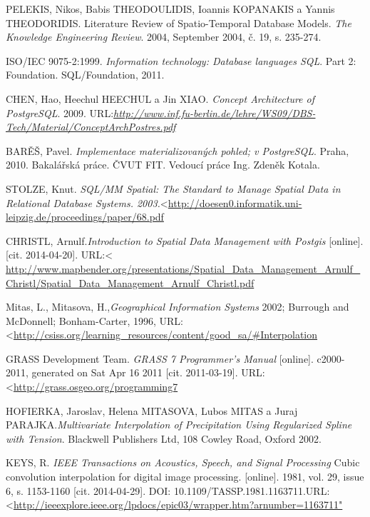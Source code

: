 \documentclass[a4paper,12pt,oneside]{report}
\begin{document}
\begin{thebibliography}{99}
PELEKIS, Nikos, Babis THEODOULIDIS, Ioannis KOPANAKIS a Yannis THEODORIDIS. Literature Review of Spatio-Temporal Database Models. \textit{The Knowledge Engineering Review}. 2004, September 2004, č. 19, s. 235-274. 

ISO/IEC 9075-2:1999. \textit{Information technology: Database languages SQL}. Part 2: Foundation. SQL/Foundation, 2011. 

CHEN, Hao, Heechul HEECHUL a Jin XIAO. \textit{Concept Architecture of PostgreSQL}. 2009. URL:\textit{\url{http://www.inf.fu-berlin.de/lehre/WS09/DBS-Tech/Material/ConceptArchPostres.pdf}}

BARĚŠ, Pavel. \textit{Implementace materializovaných pohled; v PostgreSQL}. Praha, 2010. Bakalářská práce. ČVUT FIT. Vedoucí práce Ing. Zdeněk Kotala.

STOLZE, Knut. \textit{SQL/MM Spatial: The Standard to Manage Spatial Data in Relational Database Systems. 2003.}\textless\url {http://doesen0.informatik.uni-leipzig.de/proceedings/paper/68.pdf}

CHRISTL, Arnulf.\textit{Introduction to Spatial Data Management with Postgis }
[online]. [cit. 2014-04-20]. URL:\textless\url { http://www.mapbender.org/presentations/Spatial_Data_Management_Arnulf_Christl/Spatial_Data_Management_Arnulf_Christl.pdf}

Mitas, L., Mitasova, H.,\textit{Geographical Information Systems}
2002; Burrough and McDonnell; Bonham-Carter, 1996, URL: \textless\url {http://csiss.org/learning_resources/content/good_sa/#Interpolation}


GRASS Development Team.\textit{ GRASS 7 Programmer’s Manual}
[online]. c2000-2011, generated on Sat Apr 16 2011 [cit. 2011-03-19]. URL:\textless\url {http://grass.osgeo.org/programming7  }

HOFIERKA, Jaroslav, Helena  MITASOVA, Lubos MITAS a Juraj PARAJKA.\textit{Multivariate Interpolation of Precipitation Using Regularized Spline with Tension}. Blackwell Publishers Ltd, 108 Cowley Road, Oxford 2002. 

KEYS, R. \textit{ IEEE Transactions on Acoustics, Speech, and Signal Processing}
Cubic convolution interpolation for digital image processing. [online]. 1981, vol. 29, issue 6, s. 1153-1160 [cit. 2014-04-29]. DOI: 10.1109/TASSP.1981.1163711.URL:\textless\url {http://ieeexplore.ieee.org/lpdocs/epic03/wrapper.htm?arnumber=1163711"}



\end{thebibliography}
\end{document}
